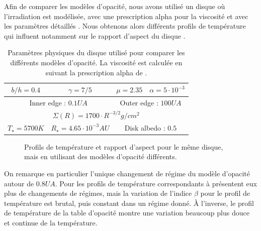 Afin de comparer les modèles d'opacité, nous avons utilisé un disque où l'irradiation est modélisée, avec une prescription alpha pour la viscosité et avec les paramètres détaillés . Nous obtenons alors différents profils de température qui influent notamment sur le rapport d'aspect du disque . 

\begin{table}[htbp]
\centering
\begin{tabular}{|c|c|c|c|}
\hline
$b/h = 0.4$ & $\gamma = 7/5$ & $\mu = 2.35$ & $\alpha = 5\cdot 10^{-3}$ \\\hline
\multicolumn{2}{|c|}{Inner edge : $0.1\unit{UA}$} & \multicolumn{2}{c|}{Outer edge : $100\unit{UA}$}\\\hline
\multicolumn{4}{|c|}{$\Sigma(R) = 1700 \cdot R^{-3/2}\unit{g/cm^2}$}\\\hline
$T_\star = 5700\unit{K}$ & $R_\star = 4.65\cdot 10^{-3}\unit{AU}$ & \multicolumn{2}{c|}{Disk albedo : $0.5$}\\\hline
\end{tabular}
\caption{Paramètres physiques du disque utilisé pour comparer les différents modèles d'opacité. La viscosité est calculée en suivant la prescription alpha de
\cite{shakura1973black}.}\label{tab:opacity_disk_parameters}
\end{table}

\begin{figure}[htbp]
\centering
{}\hfill
{}

\caption{Profils de température et rapport d'aspect pour le même disque, mais en utilisant des modèles d'opacité différents.}\label{fig:opacity_profiles}
\end{figure}

On remarque en particulier l'unique changement de régime du modèle d'opacité \cite{chambers2009analytic} autour de $0.8\unit{UA}$. Pour les profils de température correspondants à \cite{bell1994FU, zhu2009nonsteady} présentent eux plus de changements de régimes, mais la variation de l'indice $\beta$ pour le profil de température est brutal, puis constant dans un régime donné. À l'inverse, le profil de température de la table d'opacité \cite{hure2000transition} montre une variation beaucoup plus douce et continue de la température. 


